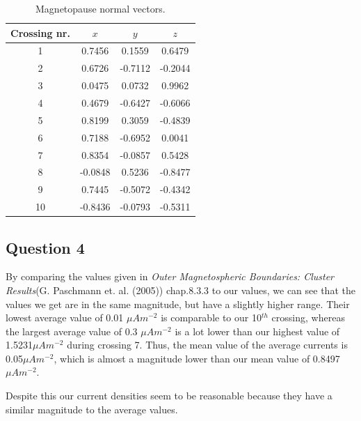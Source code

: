 \begin{table}[H]
\centering
\caption{Magnetopause normal vectors.}
\begin{tabular}{ |c||c c c| }
    \hline
    Crossing nr. & $x$ & $y$ & $z$  \\ \hline \hline
  1 &  0.7456 &   0.1559  &  0.6479 \\ \hline
  2 &  0.6726  & -0.7112  & -0.2044 \\ \hline
  3 &  0.0475 &   0.0732  &  0.9962 \\ \hline
  4 &  0.4679  &-0.6427  & -0.6066 \\ \hline
  5 &  0.8199 &   0.3059 &  -0.4839 \\ \hline
  6 &  0.7188  & -0.6952  &  0.0041 \\ \hline
  7 &  0.8354   &-0.0857  &  0.5428 \\ \hline
  8 & -0.0848   & 0.5236  & -0.8477 \\ \hline
  9 &  0.7445  & -0.5072  & -0.4342 \\ \hline
  10 & -0.8436  & -0.0793  & -0.5311 \\ \hline
   
    \end{tabular}
\label{table:xyzdata}
\end{table}

\subsection*{Question 4}
   By comparing the values given in \textit{Outer Magnetospheric Boundaries: Cluster Results}(G. Paschmann et. al. (2005)) chap.8.3.3 to our values, we can see that the values we get are in the same magnitude, but have a slightly higher range. Their lowest average value of 0.01 $\mu A m^{-2}$ is comparable to our 10$^{th}$ crossing, whereas the largest average value of 0.3 $\mu A m^{-2}$ is a lot lower than our highest value of 1.5231$\mu A m^{-2}$ during crossing 7. Thus, the mean value of the average currents is 0.05$\mu A m^{-2}$, which is almost a magnitude lower than our mean value of 0.8497$\mu A m^{-2}$.
   
Despite this our current densities seem to be reasonable because they have a similar magnitude to the average values.

